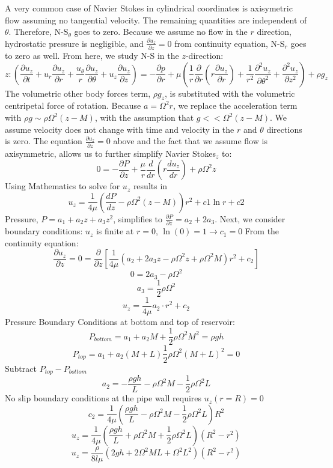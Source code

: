 A very common case of Navier Stokes in cylindrical coordinates is axisymetric flow assuming no tangential velocity. The remaining quantities are independent of $\theta$. Therefore, N-S$_\theta$ goes to zero. Because we assume no flow in the $r$ direction, hydrostatic pressure is negligible, and $\frac{\partial u_z}{\partial z} = 0$ from continuity equation, N-S$_r$ goes to zero as well. From here, we study N-S in the $z$-direction:
\[z:(
\frac{\partial u_z}{\partial t}
+u_r\frac{\partial u_z}{\partial r}
+\frac{u_\theta}{r}\frac{\partial u_z}{\partial \theta}
+u_z\frac{\partial u_z}{\partial z})
= -\frac{\partial p}{\partial r}
+\mu(
\frac{1}{r}\frac{\partial}{\partial r}(
r\frac{\partial u_z}{\partial r})
+\frac{1}{r^2}\frac{\partial^2 u_z}{\partial \theta^2}
+\frac{\partial^2 u_z}{\partial z^2})
+\rho g_z
\]
The volumetric other body forces term, $\rho g_z$, is substituted with the volumetric centripetal force of rotation. Because $a = \Omega^2 r$, we replace the acceleration term with $\rho g \sim \rho \Omega^2 (z-M)$, with the assumption that $g<<\Omega^2 (z-M)$. We assume velocity does not change with time and velocity in the $r$ and $\theta$ directions is zero. The equation $\frac{\partial u_z}{\partial z} = 0$ above and the fact that we assume flow is axisymmetric, allows us to further simplify Navier Stokes$_z$ to:
\[0 = -\frac{\partial P}{\partial z}
+ \frac{\mu}{r}\frac{d}{dr}(
r\frac{du_z}{dr})
+\rho\Omega^2z
\]
Using Mathematics to solve for $u_z$ results in
\[u_z
= \frac{1}{4\mu}(
\frac{dP}{dz} - \rho\Omega^2(z-M))
r^2+c1\ln{r}+c2
\]
Pressure, $P=a_1+a_2z+a_3z^2$, simplifies to $\frac{\partial P}{\partial z} = a_2+2a_3$.
Next, we consider boundary conditions: $u_z$ is finite at $r=0$, $\ln{(0)}=1\rightarrow c_1=0$
From the continuity equation:
\[\frac{\partial u_z}{\partial z}
= 0 = \frac{\partial}{\partial z}
[\frac{1}{4\mu}(a_2+2a_3z-\rho\Omega^2z+\rho\Omega^2M)r^2+c_2]
\]
\[0=2a_3-\rho\Omega^2\]
\[a_3=\frac{1}{2}\rho\Omega^2\]
\[u_z=\frac{1}{4\mu}a_2 \cdot r^2 + c_2\]
Pressure Boundary Conditions at bottom and top of reservoir:
\[P_{bottom} = a_1+a_2M+\frac{1}{2}\rho\Omega^2M^2=\rho gh\]
\[P_{top}=a_1+a_2(M+L)\frac{1}{2}\rho\Omega^2(M+L)^2 = 0\]
Subtract $P_{top}-P_{bottom}$
\[a_2=-\frac{\rho gh}{L} - \rho\Omega^2M-\frac{1}{2}\rho\Omega^2L\]
No slip boundary conditions at the pipe wall requires $u_z(r=R)=0$
\[c_2 = \frac{1}{4\mu}(\frac{\rho gh}{L}-\rho\Omega^2M-\frac{1}{2}\rho\Omega^2L)R^2\]
\[u_z=\frac{1}{4\mu}(\frac{\rho gh}{L}+\rho\Omega^2M+\frac{1}{2}\rho\Omega^2L)(R^2-r^2)\]
\[u_z=\frac{\rho}{8l\mu}(2gh+2\Omega^2ML+\Omega^2L^2)(R^2-r^2)\]
